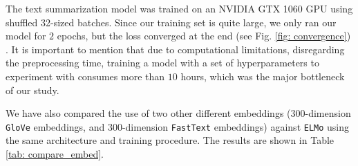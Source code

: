 The text summarization model was trained on an NVIDIA GTX 1060 GPU using shuffled 32-sized batches. Since our training set is quite large, we only ran our model for $2$ epochs, but the loss converged at the end (see Fig. \ref{fig: convergence}) . It is important to mention that due to computational limitations, disregarding the preprocessing time, training a model with a set of hyperparameters to experiment with consumes more than $10$ hours, which was the major bottleneck of our study. 

We have also compared the use of two other different embeddings ($300$-dimension \texttt{GloVe} embeddings, and $300$-dimension \texttt{FastText} embeddings) against \texttt{ELMo} using the same architecture and training procedure. The results are shown in Table \ref{tab: compare_embed}.




